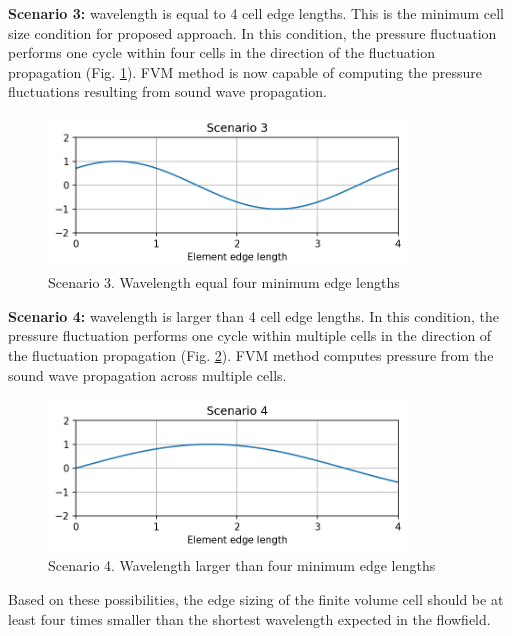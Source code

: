 \textbf{Scenario 3:} wavelength is equal to 4 cell edge lengths. This is the minimum cell size condition for proposed approach. In this condition, the pressure fluctuation performs one cycle within four cells in the direction of the fluctuation propagation (Fig. \ref{scen3}). FVM method is now capable of computing the pressure fluctuations resulting from sound wave propagation.

\begin{figure}[h!]
\centering %
\includegraphics[width=0.85\textwidth]{Pictures/case3.png}
\caption{Scenario 3. Wavelength equal four minimum edge lengths}
\label{scen3}
\end{figure}

\textbf{Scenario 4:} wavelength is larger than 4 cell edge lengths. In this condition, the pressure fluctuation performs one cycle within multiple cells in the direction of the fluctuation propagation (Fig. \ref{scen4}). FVM method computes pressure from the sound wave propagation across multiple cells.

\begin{figure}[h!]
\centering %
\includegraphics[width=0.85\textwidth]{Pictures/case4.png}
\caption{Scenario 4. Wavelength larger than four minimum edge lengths}
\label{scen4}
\end{figure}

Based on these possibilities, the edge sizing of the finite volume cell should be at least four times smaller than the shortest wavelength expected in the flowfield.

